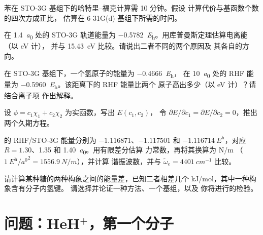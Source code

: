 \begin{exercise}[$\star\star$]\label{exo:b3:computational-chemistry:7}
苯在 STO-3G 基组下的哈特里–福克计算需 10 分钟。假设
计算代价与基函数个数的四次方成正比，
估算在 6-31G(d) 基组下所需的时间。
\end{exercise}

\begin{exercise}[$\star\star$]\label{exo:b3:computational-chemistry:8}
 在 \qty{1.4}{\bohr} 处的 STO-3G 轨道能量为
\qty{-0.5782}{\hartree}。用库普曼斯定理估算电离能（以 eV 计），
并与 \qty{15.43}{eV} 比较。请说出二者不同的两个原因及
其各自的方向。
\end{exercise}

\begin{exercise}[$\star\star$]\label{exo:b3:computational-chemistry:9}
在 STO-3G 基组下，一个氢原子的能量为 \qty{-0.4666}{\hartree}，
 在 \qty{10}{\bohr} 处的 RHF 能量为 \qty{-0.5960}{\hartree}。该距离下的 RHF 能量比两个
原子高出多少（以 eV 计）？请结合离子项
作出解释。
\end{exercise}

\begin{exercise}[$\star\star\star$]\label{exo:b3:computational-chemistry:10}
设 $\phi = c_1\chi_1 + c_2\chi_2$ 为实函数，写出 $E(c_1,c_2)$，
令 $\partial E/\partial c_1 =
\partial E/\partial c_2 = 0$，推出两个久期方程。
\end{exercise}

\begin{exercise}[$\star\star\star$]\label{exo:b3:computational-chemistry:11}
 的 RHF/STO-3G 能量分别为 $-1.116871$、$-1.117501$ 和
$\qty{-1.116714}{\hartree}$，对应 $R = 1.30$、1.35 和 \qty{1.40}{\bohr}。用有限差分估算
力常数，再将其换算为 \unit{N/m}
（$\qty{1}{\hartree\per\bohr\squared} = \qty{1556.9}{N/m}$），并计算
谐振波数，并与 $\tilde\omega_e = \qty{4401}{cm^{-1}}$ 比较。
\end{exercise}

\begin{exercise}[$\star\star\star$]\label{exo:b3:computational-chemistry:12}
请计算某种糖的两种构象之间的能量差，已知二者相差几个
\unit{kJ/mol}，其中一种构象含有分子内氢键。
请选择并论证一种方法、一个基组，以及
你将进行的检验。
\end{exercise}

\section{问题：HeH\texorpdfstring{$^+$}{+}，第一个分子}

